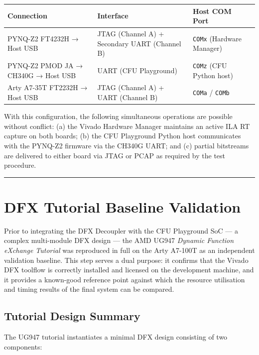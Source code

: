 \begin{table}[htbp]
\centering
\begin{tabularx}{\textwidth}{X X X X}
\toprule
Connection & Interface & Host COM Port \\
\midrule
PYNQ-Z2 FT4232H → Host USB & JTAG (Channel A) + Secondary UART (Channel B) & \texttt{COMx} (Hardware Manager) \\
PYNQ-Z2 PMOD JA → CH340G → Host USB & UART (CFU Playground) & \texttt{COMz} (CFU Python host) \\
Arty A7-35T FT2232H → Host USB & JTAG (Channel A) + UART (Channel B) & \texttt{COMa} / \texttt{COMb} \\
\bottomrule
\end{tabularx}
\end{table}

With this configuration, the following simultaneous operations are possible without conflict: (a) the Vivado Hardware Manager maintains an active ILA RT capture on both boards; (b) the CFU Playground Python host communicates with the PYNQ-Z2 firmware via the CH340G UART; and (c) partial bitstreams are delivered to either board via JTAG or PCAP as required by the test procedure.

\vspace{0.4em}\hrule\vspace{0.4em}

\section{DFX Tutorial Baseline Validation}

Prior to integrating the DFX Decoupler with the CFU Playground SoC — a complex multi-module DFX design — the AMD UG947 \textit{Dynamic Function eXchange Tutorial} was reproduced in full on the Arty A7-100T as an independent validation baseline. This step serves a dual purpose: it confirms that the Vivado DFX toolflow is correctly installed and licensed on the development machine, and it provides a known-good reference point against which the resource utilisation and timing results of the final system can be compared.

\subsection{Tutorial Design Summary}

The UG947 tutorial instantiates a minimal DFX design consisting of two components:

